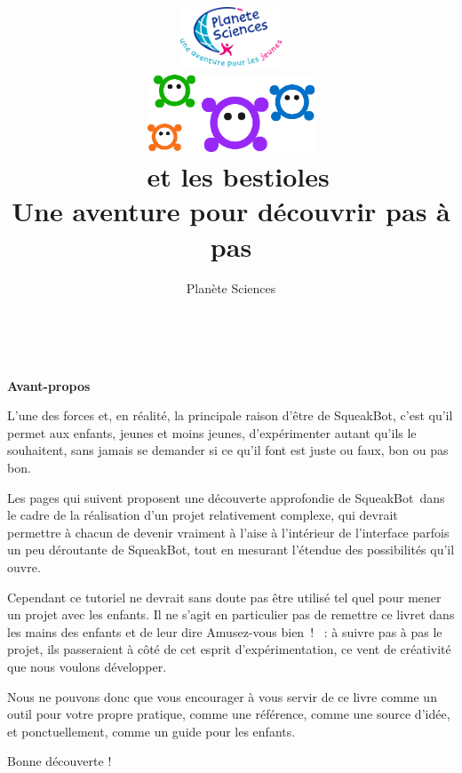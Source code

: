 \documentclass[a4paper,12pt]{book}
\title{
	\includegraphics[width=3cm]{national.png}\\
	\vfill
	\includegraphics[width=5cm]{bestioles.png}\\
	\vspace{3em}
	\LARGE{\textbf{\appName~et les bestioles}}\\[1cm]
	\large{Une aventure pour découvrir pas à pas \appName}\\[1cm]
	\vfill
}
\author{
Planète Sciences
}
\def\appName{SqueakBot}
\begin{document}

\maketitle

\tableofcontents


\clearpage
\thispagestyle{empty}
~
\vfill
\begin{center}
    \LARGE{\textbf{Avant-propos}}
\end{center}

\vspace{3em}

L'une des forces et, en réalité, la principale raison d'être de \appName, c'est qu'il permet aux enfants, jeunes et moins jeunes, d'expérimenter autant qu'ils le souhaitent, sans jamais se demander si ce qu'il font est juste ou faux, bon ou pas bon.

Les pages qui suivent proposent une découverte approfondie de \appName~dans le cadre de la réalisation d'un projet relativement complexe, qui devrait permettre à chacun de devenir vraiment à l'aise à l'intérieur de l'interface parfois un peu déroutante de \appName, tout en mesurant l'étendue des possibilités qu'il ouvre.

Cependant ce tutoriel ne devrait sans doute pas être utilisé tel quel pour mener un projet avec les enfants. Il ne s'agit en particulier pas de remettre ce livret dans les mains des enfants et de leur dire \og Amusez-vous bien~! \fg~: à suivre pas à pas le projet, ils passeraient à côté de cet esprit d'expérimentation, ce vent de créativité que nous voulons développer.

Nous ne pouvons donc que vous encourager à vous servir de ce livre comme un outil pour votre propre pratique, comme une référence, comme une source d'idée, et ponctuellement, comme un guide pour les enfants.

Bonne découverte !

\vfill

\end{document}
